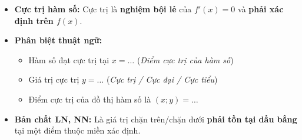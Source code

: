 \documentclass[12pt,a4paper]{article}
\begin{document}
\begin{theorybox}
    \begin{itemize}\setlength{\itemsep}{2pt}
        \item \textbf{Cực trị hàm số:} Cực trị là \textbf{nghiệm bội lẻ} của $f'(x) = 0$ và \textbf{phải xác định trên $f(x)$}.
        \item \textbf{Phân biệt thuật ngữ:}\vspace{2pt}
        \begin{itemize}\setlength{\itemsep}{2pt}
            \item Hàm số đạt cực trị tại $x = \dots$ (\textit{Điểm cực trị của hàm số})
            \item Giá trị cực trị $y = \dots$ (\textit{Cực trị / Cực đại / Cực tiểu})
            \item Điểm cực trị của đồ thị hàm số là $(x; y) = \dots$
        \end{itemize}
        \item \textbf{Bản chất LN, NN:} Là giá trị chặn trên/chặn dưới \textbf{phải tồn tại dấu bằng} tại một điểm thuộc miền xác định.
    \end{itemize}
\end{theorybox}







\newpage


\vspace{0.15cm}
\end{document}
